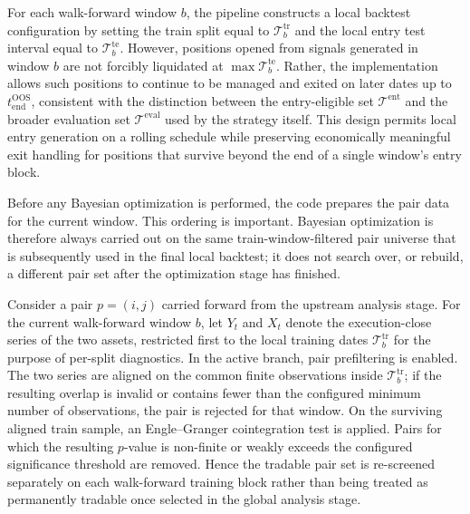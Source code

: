 \documentclass[11pt,a4paper]{article}
\begin{document}
For each walk-forward window \(b\), the pipeline constructs a local backtest
configuration by setting the train split equal to
\(\mathcal T_b^{\mathrm{tr}}\) and the local entry test interval equal to
\(\mathcal T_b^{\mathrm{te}}\). However, positions opened from signals
generated in window \(b\) are not forcibly liquidated at
\(\max \mathcal T_b^{\mathrm{te}}\). Rather, the implementation allows such
positions to continue to be managed and exited on later dates up to
\(t_{\mathrm{end}}^{\mathrm{OOS}}\), consistent with the distinction between the
entry-eligible set \(\mathcal T^{\mathrm{ent}}\) and the broader evaluation set
\(\mathcal T^{\mathrm{eval}}\) used by the strategy itself. This design permits
local entry generation on a rolling schedule while preserving economically
meaningful exit handling for positions that survive beyond the end of a single
window's entry block.

Before any Bayesian optimization is performed, the code prepares the pair data
for the current window. This ordering is important. Bayesian optimization is
therefore always carried out on the same train-window-filtered pair universe
that is subsequently used in the final local backtest; it does not search over,
or rebuild, a different pair set after the optimization stage has finished.

Consider a pair \(p=(i,j)\) carried forward from the upstream analysis stage.
For the current walk-forward window \(b\), let \(Y_t\) and \(X_t\) denote the
execution-close series of the two assets, restricted first to the local
training dates \(\mathcal T_b^{\mathrm{tr}}\) for the purpose of per-split
diagnostics. In the active branch, pair prefiltering is enabled. The two series
are aligned on the common finite observations inside
\(\mathcal T_b^{\mathrm{tr}}\); if the resulting overlap is invalid or contains
fewer than the configured minimum number of observations, the pair is rejected
for that window. On the surviving aligned train sample, an Engle--Granger
cointegration test is applied. Pairs for which the resulting \(p\)-value is
non-finite or weakly exceeds the configured significance threshold are removed.
Hence the tradable pair set is re-screened separately on each walk-forward
training block rather than being treated as permanently tradable once selected
in the global analysis stage.
\end{document}
